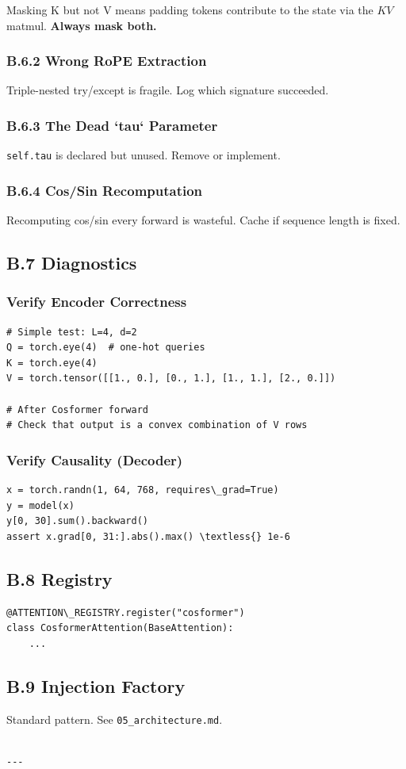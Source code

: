 Masking K but not V means padding tokens contribute to the state via the 
$KV$ matmul. \textbf{Always mask both.}

\subsubsection{B.6.2 Wrong RoPE Extraction}

Triple-nested try/except is fragile. Log which signature succeeded.

\subsubsection{B.6.3 The Dead `tau` Parameter}

\texttt{self.tau} is declared but unused. Remove or implement.

\subsubsection{B.6.4 Cos/Sin Recomputation}

Recomputing cos/sin every forward is wasteful. Cache if sequence length 
is fixed.

\subsection{B.7 Diagnostics}

\subsubsection{Verify Encoder Correctness}

\begin{lstlisting}
# Simple test: L=4, d=2
Q = torch.eye(4)  # one-hot queries
K = torch.eye(4)
V = torch.tensor([[1., 0.], [0., 1.], [1., 1.], [2., 0.]])

# After Cosformer forward
# Check that output is a convex combination of V rows
\end{lstlisting}

\subsubsection{Verify Causality (Decoder)}

\begin{lstlisting}
x = torch.randn(1, 64, 768, requires\_grad=True)
y = model(x)
y[0, 30].sum().backward()
assert x.grad[0, 31:].abs().max() \textless{} 1e-6
\end{lstlisting}

\subsection{B.8 Registry}

\begin{lstlisting}
@ATTENTION\_REGISTRY.register("cosformer")
class CosformerAttention(BaseAttention):
    ...
\end{lstlisting}

\subsection{B.9 Injection Factory}

Standard pattern. See \texttt{05\_architecture.md}.
\begin{lstlisting}

---
\end{lstlisting}